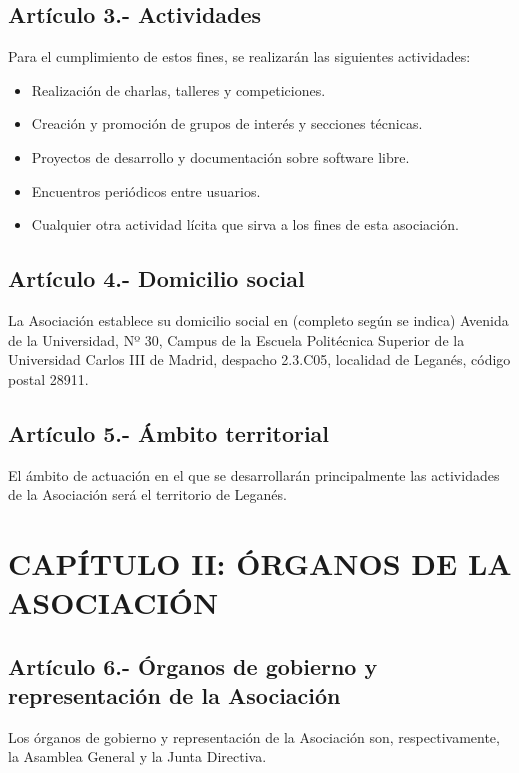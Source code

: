 \documentclass[10pt, spanish, pdftex]{gulplantilla}
\begin{document}
\subsection{Artículo 3.- Actividades}
Para el cumplimiento de estos fines, se realizarán las siguientes actividades:
\begin{itemize}
    \item Realización de charlas, talleres y competiciones.
    \item Creación y promoción de grupos de interés y secciones técnicas.
    \item Proyectos de desarrollo y documentación sobre software libre.
    \item Encuentros periódicos entre usuarios.
    \item Cualquier otra actividad lícita que sirva a los fines de esta asociación.
\end{itemize}

\subsection{Artículo 4.- Domicilio social}
La Asociación establece su domicilio social en (completo según se indica) Avenida de la Universidad, Nº 30, Campus de la Escuela Politécnica Superior de la Universidad Carlos III de Madrid, despacho 2.3.C05, localidad de Leganés, código postal 28911.

\subsection{Artículo 5.- Ámbito territorial}
El ámbito de actuación en el que se desarrollarán principalmente las actividades de la Asociación será el territorio de Leganés.


\newpage {}
\section{CAPÍTULO II: ÓRGANOS DE LA ASOCIACIÓN}


\subsection{Artículo 6.- Órganos de gobierno y representación de la Asociación}
Los órganos de gobierno y representación de la Asociación son, respectivamente, la Asamblea General y la Junta Directiva.

\newpage {}
\end{document}
